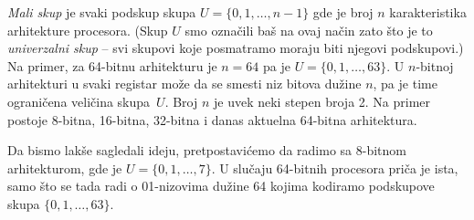 \emph{Mali skup} je svaki podskup skupa $U = \{0, 1, \ldots, n-1\}$ gde je broj $n$ karakteristika arhitekture procesora.
(Skup $U$ smo ozna\v cili ba\v s na ovaj na\v cin zato \v sto je to \emph{univerzalni skup} -- svi skupovi koje posmatramo moraju biti
njegovi podskupovi.) Na primer, za 64-bitnu arhitekturu je $n = 64$ pa je $U = \{0, 1, \ldots, 63\}$.
U $n$-bitnoj arhitekturi u svaki registar mo\v ze da se smesti niz bitova du\v zine $n$, pa je time ograni\v cena veli\v cina skupa~$U$.
Broj $n$ je uvek neki stepen broja 2. Na primer postoje 8-bitna, 16-bitna, 32-bitna i danas aktuelna 64-bitna arhitektura.

Da bismo lak\v se sagledali ideju, pretpostavi\'cemo da radimo sa 8-bitnom arhitekturom, gde je $U = \{0, 1, \ldots, 7\}$.
U slu\v caju 64-bitnih procesora pri\v ca je ista, samo \v sto se tada radi o 01-nizovima du\v zine 64 kojima kodiramo
podskupove skupa $\{0, 1, \ldots, 63\}$.

